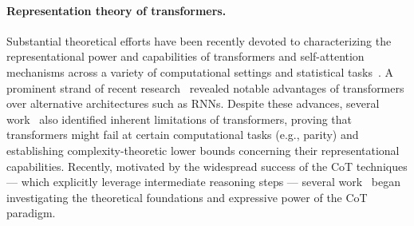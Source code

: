 \documentclass[english]{article}
\begin{document}




\paragraph{Representation theory of transformers.}
Substantial theoretical efforts have been recently devoted to characterizing the representational power and capabilities of transformers and self-attention mechanisms across a variety of  computational settings and statistical tasks~\citep{perez2019turing,elhage2021mathematical,liu2023transformerslearnshortcutsautomata,likhosherstov2021expressivepowerselfattentionmatrices,wen2023transformersuninterpretablemyopicmethods,yao2023selfattentionnetworksprocessbounded,chen2024provably}. A prominent strand of recent research~\citep{sanford2023representationalstrengthslimitationstransformers,wen2024rnnstransformersyetkey,jelassi2024repeatmetransformersbetter} revealed notable advantages of transformers over alternative architectures such as RNNs. Despite these advances, several work~\citep{Hahn2020,sanford2024transformersparallelcomputationlogarithmic,peng2024limitationstransformerarchitecture,chen2024theoreticallimitationsmultilayertransformer} also identified inherent limitations of transformers, proving that transformers might fail at certain computational tasks (e.g., parity) and establishing complexity-theoretic lower bounds concerning their representational capabilities. Recently, motivated by the widespread success of the CoT techniques --- which explicitly leverage intermediate reasoning steps --- several work~\citep{li2024chainthoughtempowerstransformers,merrillexpressive,feng2023revealingmysterychainthought} began investigating the theoretical foundations and expressive power of the CoT paradigm.





 


\end{document}
